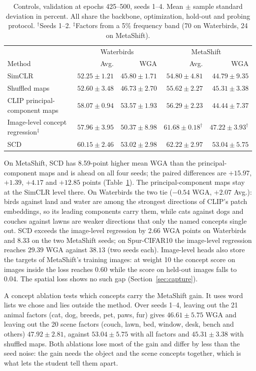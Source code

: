 \documentclass{article}
\begin{document}
\begin{table}[htbp]
\centering\small
\caption{Controls, validation at epochs 425--500, seeds 1--4. Mean $\pm$ sample standard deviation in percent. All share the backbone, optimization, hold-out and probing protocol. $^\dagger$Seeds 1--2. $^\ddagger$Factors from a 5\% frequency band (70 on Waterbirds, 24 on MetaShift).}
\begin{tabular}{lrrrr}
\toprule
& \multicolumn{2}{c}{Waterbirds} & \multicolumn{2}{c}{MetaShift} \\
Method & Avg. & WGA & Avg. & WGA \\
\midrule
SimCLR & $52.25\pm1.21$ & $45.80\pm1.71$ & $54.80\pm4.81$ & $44.79\pm9.35$ \\
Shuffled maps & $52.60\pm3.48$ & $46.73\pm2.70$ & $55.62\pm2.27$ & $45.31\pm3.38$ \\
CLIP principal-component maps & $58.07\pm0.94$ & $53.57\pm1.93$ & $56.29\pm2.23$ & $44.44\pm7.37$ \\
Image-level concept regression$^\ddagger$ & $57.96\pm3.95$ & $50.37\pm8.98$ & $61.68\pm0.18^\dagger$ & $47.22\pm3.93^\dagger$ \\
SCD & $60.15\pm2.46$ & $53.02\pm2.98$ & $62.22\pm2.97$ & $53.04\pm5.75$ \\
\bottomrule
\end{tabular}
\label{tab:controls}
\end{table}

On MetaShift, SCD has 8.59-point higher mean WGA than the principal-component maps and is ahead on all four seeds; the paired differences are $+15.97$, $+1.39$, $+4.17$ and $+12.85$ points (Table~\ref{tab:controls}). The principal-component maps stay at the SimCLR level there. On Waterbirds the two tie ($-0.54$ WGA, $+2.07$ Avg.): birds against land and water are among the strongest directions of CLIP's patch embeddings, so its leading components carry them, while cats against dogs and couches against lawns are weaker directions that only the named concepts single out. SCD exceeds the image-level regression by 2.66 WGA points on Waterbirds and 8.33 on the two MetaShift seeds; on Spur-CIFAR10 the image-level regression reaches $29.39$ WGA against $38.13$ (two seeds each). Image-level heads also store the targets of MetaShift's training images: at weight 10 the concept score on images inside the loss reaches 0.60 while the score on held-out images falls to 0.04. The spatial loss shows no such gap (Section~\ref{sec:capture}).

A concept ablation tests which concepts carry the MetaShift gain. It uses word lists we chose and lies outside the method. Over seeds 1--4, leaving out the 21 animal factors (cat, dog, breeds, pet, paws, fur) gives $46.61\pm5.75$ WGA and leaving out the 20 scene factors (couch, lawn, bed, window, desk, bench and others) $47.92\pm2.81$, against $53.04\pm5.75$ with all factors and $45.31\pm3.38$ with shuffled maps. Both ablations lose most of the gain and differ by less than the seed noise: the gain needs the object and the scene concepts together, which is what lets the student tell them apart.
\end{document}
